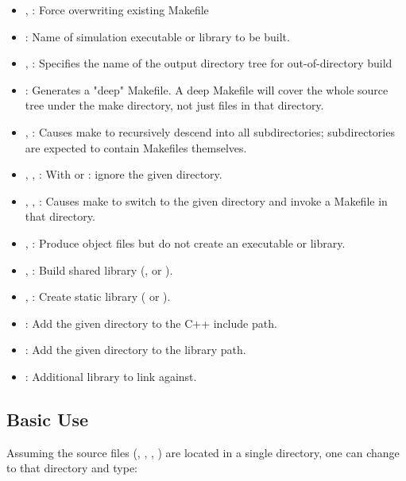 \begin{itemize}
    \item {},  : Force overwriting existing Makefile
    \item {} : Name of simulation executable or library to be built.
    \item {},  :
                          Specifies the name of the output directory tree for out-of-directory build
    \item {} : Generates a "deep" Makefile. A deep Makefile will
                          cover the whole source tree under the make directory,
                          not just files in that directory.
    \item {},  : Causes make to recursively descend into all subdirectories;
                          subdirectories are expected to contain Makefiles themselves.
    \item {}, ,  :
                          With  or : ignore the given directory.
    \item {}, ,  :
                          Causes make to switch to the given directory and invoke
                          a Makefile in that directory.
    \item {},  : Produce object files but do not create an executable or library.
    \item {},  : Build shared library (,  or ).
    \item {},  : Create static library ( or ).
    \item {} : Add the given directory to the C++ include path.
    \item {} : Add the given directory to the library path.
    \item {} : Additional library to link against.
\end{itemize}


\subsection{Basic Use}
\label{sec:build-sim-progs:makemake-basic-use}

Assuming the source files (, , , )
are located in a single directory, one can change to that directory and type:

